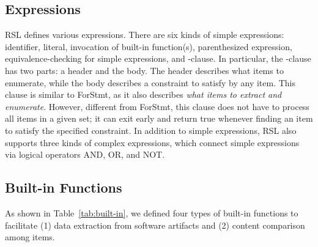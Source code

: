 
\vspace{-0.5em}
\subsection{Expressions}
RSL defines various expressions. 
There are
 six kinds of simple expressions: identifier, literal, 
 invocation of built-in function(s), parenthesized expression, equivalence-checking for simple expressions, and -clause. In particular, the
-clause has two parts: a header and the body. The header 
describes what items to enumerate, while the body  describes a constraint to satisfy by any item. This clause 
is similar to ForStmt, as it also describes \emph{what items to extract and enumerate}. However, different from ForStmt, this
clause does not have to process all items in a given set; it can exit early and return true whenever finding an item to satisfy the specified constraint.
In addition to simple expressions, RSL also supports three kinds of complex expressions, which connect simple expressions via logical operators AND, OR, and NOT.

\vspace{-0.5em}
\subsection{Built-in Functions}
As shown in Table~\ref{tab:built-in}, we defined four types of built-in functions to facilitate (1) data extraction from software artifacts and (2) content comparison among items.

